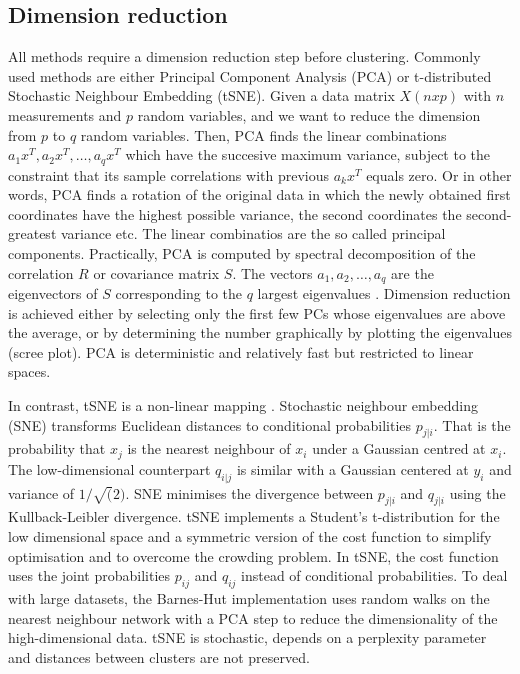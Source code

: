 \documentclass[12pt, a4paper]{article}\usepackage[]{graphicx}\usepackage[]{color}
\begin{document}
\subsection{Dimension reduction}
All methods require a dimension reduction step before clustering. Commonly used methods are either Principal Component Analysis (PCA) \citep{hotelling1933analysis} or t-distributed Stochastic Neighbour Embedding (tSNE). Given a data matrix $X (nxp)$ with $n$ measurements and $p$ random variables, and we want to reduce the dimension from $p$ to $q$ random variables. Then, PCA finds the linear combinations $a_{1}x^T, a_{2}x^T,\ldots, a_{q}x^T$ which have the succesive maximum variance, subject to the constraint that its sample correlations with previous $a_{k}x^T$ equals zero.
Or in other words, PCA finds a rotation of the original data in which the newly obtained first coordinates have the highest possible variance, the second coordinates the second-greatest variance etc. The linear combinatios are the so called principal components.
Practically, PCA is computed by spectral decomposition of the correlation $R$ or covariance matrix $S$. The vectors $a_{1}, a_{2},\ldots, a_{q}$ are the eigenvectors of $S$ corresponding to the $q$ largest eigenvalues \citep{jolliffe1986principal}.  Dimension reduction is achieved either by selecting only the first few PCs whose eigenvalues are above the average, or by determining the number graphically by plotting the eigenvalues (scree plot). PCA is deterministic and relatively fast but restricted to linear spaces.

In contrast,  tSNE is a non-linear mapping \citep{van2013barnes}. Stochastic neighbour embedding (SNE) transforms Euclidean distances to conditional probabilities $p_{j|i}$. That is the probability that \(x_j\) is the nearest neighbour of $x_i$ under a Gaussian centred at $x_i$. The low-dimensional counterpart $q_{i|j}$ is similar with a Gaussian centered at $y_i$ and variance of $1/\sqrt(2)$. SNE minimises the divergence between $p_{j|i}$ and $q_{j|i}$ using the Kullback-Leibler divergence. tSNE implements a Student's t-distribution for the low dimensional space and a symmetric version of the cost function to simplify optimisation and to overcome the crowding problem. In tSNE, the cost function uses the joint probabilities $p_{ij}$ and $q_{ij}$ instead of conditional probabilities. To deal with large datasets, the Barnes-Hut implementation uses random walks on the nearest neighbour network with a PCA step to reduce the dimensionality of the high-dimensional data. tSNE is stochastic, depends on a perplexity parameter and distances between clusters are not preserved. 
\end{document}
